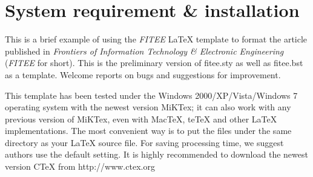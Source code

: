 \documentclass[twoside,twocolumn]{article}
\begin{document}






\articleType{}

\maketitle



\section{System requirement \& installation} \label{sec:introduction}
  This is a brief example of using the \emph{FITEE} LaTeX template to format the article published in \emph{Frontiers of Information Technology {\sf \slshape \&} Electronic Engineering} (\emph{FITEE} for short). This is the preliminary version of fitee.sty as well as fitee.bst as a template. Welcome reports on bugs and suggestions for improvement.



This template has been tested under the Windows 2000/XP/Vista/Windows 7 operating system with the newest version MiKTex; it can also work with any previous version of MiKTex, even with MacTeX, teTeX and other LaTeX implementations. The most convenient way is to put the files under the same directory as your LaTeX source file. For saving processing time, we suggest authors use the default setting. It is highly recommended to download the newest version CTeX from http://www.ctex.org
\end{document}

